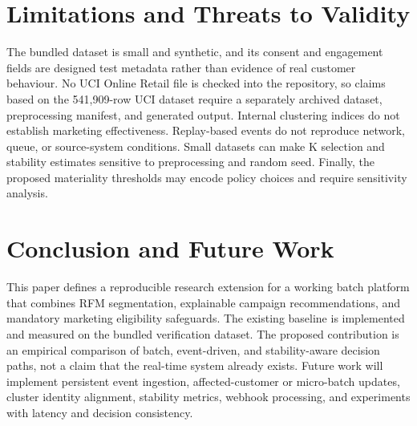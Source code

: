 \documentclass[conference]{IEEEtran}
\begin{document}
\section{Limitations and Threats to Validity}
The bundled dataset is small and synthetic, and its consent and engagement fields are designed test metadata rather than evidence of real customer behaviour. No UCI Online Retail file is checked into the repository, so claims based on the 541,909-row UCI dataset require a separately archived dataset, preprocessing manifest, and generated output. Internal clustering indices do not establish marketing effectiveness. Replay-based events do not reproduce network, queue, or source-system conditions. Small datasets can make K selection and stability estimates sensitive to preprocessing and random seed. Finally, the proposed materiality thresholds may encode policy choices and require sensitivity analysis.

\section{Conclusion and Future Work}
This paper defines a reproducible research extension for a working batch platform that combines RFM segmentation, explainable campaign recommendations, and mandatory marketing eligibility safeguards. The existing baseline is implemented and measured on the bundled verification dataset. The proposed contribution is an empirical comparison of batch, event-driven, and stability-aware decision paths, not a claim that the real-time system already exists. Future work will implement persistent event ingestion, affected-customer or micro-batch updates, cluster identity alignment, stability metrics, webhook processing, and experiments with latency and decision consistency.
\end{document}
